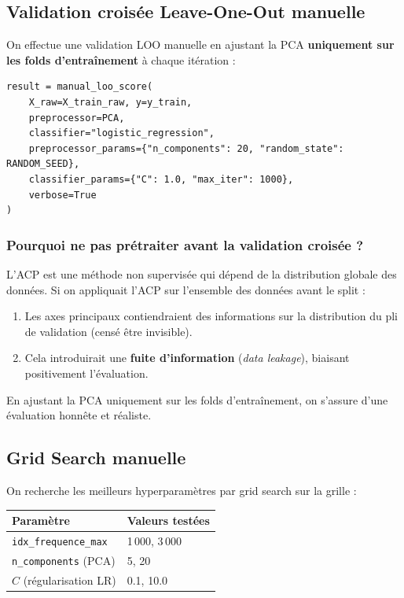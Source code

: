 \documentclass{name}
\begin{document}
\subsection{Validation croisée Leave-One-Out manuelle}

On effectue une validation LOO manuelle en ajustant la PCA \textbf{uniquement sur les folds d'entraînement} à chaque itération :

\begin{lstlisting}[caption={LOO manuelle via l'API}]
result = manual_loo_score(
    X_raw=X_train_raw, y=y_train,
    preprocessor=PCA,
    classifier="logistic_regression",
    preprocessor_params={"n_components": 20, "random_state": RANDOM_SEED},
    classifier_params={"C": 1.0, "max_iter": 1000},
    verbose=True
)
\end{lstlisting}

\subsubsection{Pourquoi ne pas prétraiter avant la validation croisée ?}

L'ACP est une méthode non supervisée qui dépend de la distribution globale des données. Si on appliquait l'ACP sur l'ensemble des données avant le split :

\begin{enumerate}
    \item Les axes principaux contiendraient des informations sur la distribution du pli de validation (censé être invisible).
    \item Cela introduirait une \textbf{fuite d'information} (\textit{data leakage}), biaisant positivement l'évaluation.
\end{enumerate}

En ajustant la PCA uniquement sur les folds d'entraînement, on s'assure d'une évaluation honnête et réaliste.

\subsection{Grid Search manuelle}

On recherche les meilleurs hyperparamètres par grid search sur la grille :

\begin{center}
\begin{tabular}{ll}
\toprule
\textbf{Paramètre} & \textbf{Valeurs testées} \\
\midrule
\texttt{idx\_frequence\_max} & 1\,000, 3\,000 \\
\texttt{n\_components} (PCA) & 5, 20 \\
$C$ (régularisation LR) & 0.1, 10.0 \\
\bottomrule
\end{tabular}
\end{center}
\end{document}
